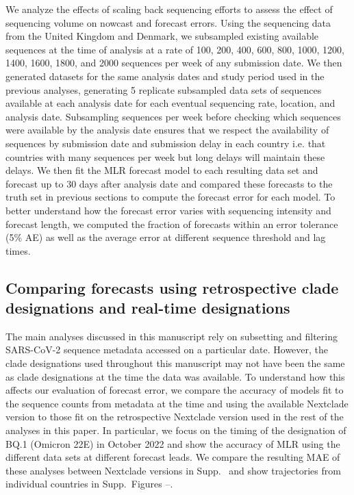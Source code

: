 \documentclass[10pt,letterpaper]{article}
\begin{document}
We analyze the effects of scaling back sequencing efforts to assess the effect of sequencing volume on nowcast and forecast errors.
Using the sequencing data from the United Kingdom and Denmark, we subsampled existing available sequences at the time of analysis at a rate of 100, 200, 400, 600, 800, 1000, 1200, 1400, 1600, 1800, and 2000 sequences per week of any submission date.
We then generated datasets for the same analysis dates and study period used in the previous analyses, generating 5 replicate subsampled data sets of sequences available at each analysis date for each eventual sequencing rate, location, and analysis date.
Subsampling sequences per week before checking which sequences were available by the analysis date ensures that we respect the availability of sequences by submission date and submission delay in each country i.e. that countries with many sequences per week but long delays will maintain these delays.
We then fit the MLR forecast model to each resulting data set and forecast up to 30 days after analysis date and compared these forecasts to the truth set in previous sections to compute the forecast error for each model.
To better understand how the forecast error varies with sequencing intensity and forecast length, we computed the fraction of forecasts within an error tolerance (5\% AE) as well as the average error at different sequence threshold and lag times.

\subsection*{Comparing forecasts using retrospective clade designations and real-time designations}

The main analyses discussed in this manuscript rely on subsetting and filtering SARS-CoV-2 sequence metadata accessed on a particular date.
However, the clade designations used throughout this manuscript may not have been the same as clade designations at the time the data was available.
To understand how this affects our evaluation of forecast error, we compare the accuracy of models fit to the sequence counts from metadata at the time and using the available Nextclade version to those fit on the retrospective Nextclade version used in the rest of the analyses in this paper.
In particular, we focus on the timing of the designation of BQ.1 (Omicron 22E) in October 2022 and show the accuracy of MLR using the different data sets at different forecast leads.
We compare the resulting MAE of these analyses between Nextclade versions in Supp.\   and show trajectories from individual countries in Supp.\ Figures --.
\end{document}
